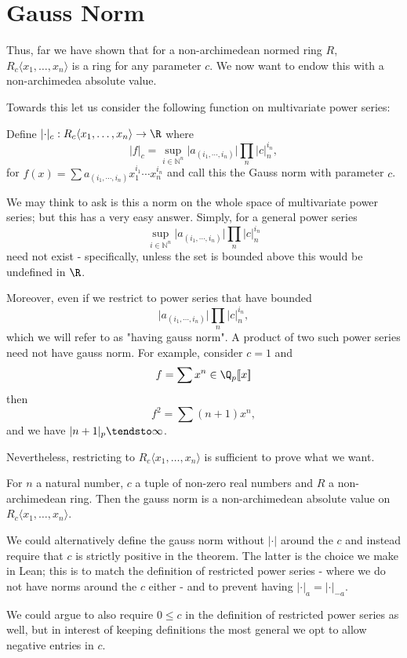 \chapter{Gauss Norm}

Thus, far we have shown that for a non-archimedean normed ring $R$, $R_c \langle x_1, \dots, x_n \rangle$
is a ring for any parameter $c$. We now want to endow this with a non-archimedea absolute value.

Towards this let us consider the following function on multivariate power series:

\begin{definition}
Define $\lvert \cdot \rvert _c :  R_c \langle x_1, \dots, x_n \rangle \to \R$ where
\[
    \lvert f \rvert _c = \sup_{i \in \mathbb{N}^n} \lvert a_{(i_1, \cdots, i_n)} \rvert
    \prod_n \lvert c \rvert _n^{i_n},
\]
for $f(x) = \sum a_{(i_1, \cdots, i_n)} x_1^{i_1} \cdots x_n^{i_n}$ and call this the Gauss norm
with parameter $c$.
\end{definition}

We may think to ask is this a norm on the whole space of multivariate power series; but this
has a very easy answer. Simply, for a general power series
\[
  \sup_{i \in \mathbb{N}^n} \lvert a_{(i_1, \cdots, i_n)} \rvert
    \prod_n \lvert c \rvert _n^{i_n}
\]
need not exist - specifically, unless the set is bounded above this would be undefined in $\R$.

Moreover, even if we restrict to power series that have bounded
\[
  \lvert a_{(i_1, \cdots, i_n)} \rvert \prod_n \lvert c \rvert _n^{i_n},
\]
which we will refer to as "having gauss norm". A product of two such power series need not have gauss
norm.
For example, consider $c = 1$ and
\[
  f = \sum x^n \in \Q_p [ \! [x] \! ]
\]
then
\[
  f^2 = \sum (n + 1) x^n,
\]
and we have $\lvert n + 1 \rvert_p \tendsto \infty$.

Nevertheless, restricting to $R_c \langle x_1, \dots, x_n \rangle$ is sufficient to prove what we want.

\begin{theorem}
  For $n$ a natural number, $c$ a tuple of non-zero real numbers and $R$ a non-archimedean ring. Then
  the gauss norm is a non-archimedean absolute value on $R_c \langle x_1, \dots, x_n \rangle$.
\end{theorem}

\begin{remark}
  We could alternatively define the gauss norm without $\lvert \cdot \rvert$ around the $c$ and instead
  require that $c$ is strictly positive in the theorem. The latter is the choice we make in Lean; this is
  to match the definition of restricted power series - where we do not have norms around the $c$ either -
  and to prevent having $\lvert \cdot \rvert_a = \lvert \cdot \rvert_{-a}.$

  We could argue to also require $0 \leq c$ in the definition of restricted power series as well, but in
  interest of keeping definitions the most general we opt to allow negative entries in $c$.
\end{remark}

